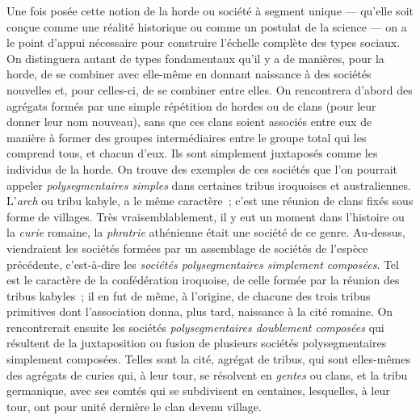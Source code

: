 \documentclass[french,twoside]{book} %
\begin{document}
Une fois posée cette notion de la horde ou société à segment unique — qu’elle soit conçue comme une réalité historique ou comme un postulat de la science — on a le point d’appui nécessaire pour construire l’échelle complète des types sociaux. On distinguera autant de types fondamentaux qu’il y a de manières, pour la horde, de se combiner avec elle-même en donnant naissance à des sociétés nouvelles et, pour celles-ci, de se combiner entre elles. On rencontrera d’abord des agrégats formés par une simple répétition de hordes ou de clans (pour leur donner leur nom nouveau), sans que ces clans soient associés entre eux de manière à former des groupes intermédiaires entre le groupe total qui les comprend tous, et chacun d’eux. Ils sont simplement juxtaposés comme les individus de la horde. On trouve des exemples de ces sociétés que l’on pourrait appeler {\itshape polysegmentaires simples} dans certaines tribus iroquoises et australiennes. L’{\itshape arch} ou tribu kabyle, a le même caractère ; c’est une réunion de clans fixés sous forme de villages. Très vraisemblablement, il y eut un moment dans l’histoire ou la {\itshape curie} romaine, la {\itshape phratrie} athénienne était une société de ce genre. Au-dessus, viendraient les sociétés formées par un assemblage de sociétés de l’espèce précédente, c’est-à-dire les {\itshape sociétés polysegmentaires simplement composées}. Tel est le caractère de la confédération iroquoise, de celle formée par la réunion des tribus kabyles ; il en fut de même, à l’origine, de chacune des trois tribus primitives dont l’association donna, plus tard, naissance à la cité romaine. On rencontrerait ensuite les sociétés {\itshape polysegmentaires doublement composées} qui résultent de la juxtaposition ou fusion de plusieurs sociétés polysegmentaires simplement composées. Telles sont la cité, agrégat de tribus, qui sont elles-mêmes des agrégats de curies qui, à leur tour, se résolvent en {\itshape gentes} ou clans, et la tribu germanique, avec ses comtés qui se subdivisent en centaines, lesquelles, à leur tour, ont pour unité dernière le clan devenu village.\par
\end{document}
